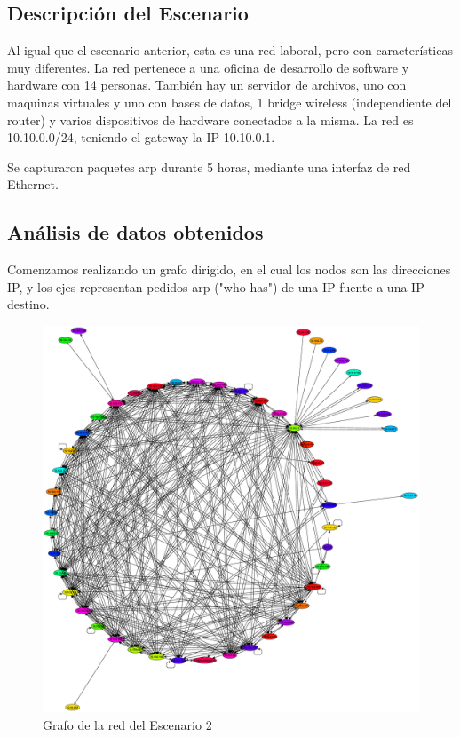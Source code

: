 \subsection{Descripci\'on del Escenario}
	\par Al igual que el escenario anterior, esta es una red laboral, pero con características muy diferentes. La red pertenece a una oficina de desarrollo de software y hardware con 14 personas. También hay un servidor de archivos, uno con maquinas virtuales y uno con bases de datos, 1 bridge wireless (independiente del router) y varios dispositivos de hardware conectados a la misma. La red es 10.10.0.0/24, teniendo el gateway la IP 10.10.0.1. 
     \par Se capturaron paquetes arp durante 5 horas, mediante una interfaz de red Ethernet.
     
\subsection{An\'alisis de datos obtenidos}
	\par Comenzamos realizando un grafo dirigido, en el cual los nodos son las direcciones IP, y los ejes representan pedidos arp ("who-has") de una IP fuente a una IP destino.
	\begin{figure}[!ht]
		\centering
		\includegraphics[width=\textwidth]{img/graph/escenario_2/grafico_de_la_red.eps}
		\caption{Grafo de la red del Escenario 2}
		\label{fig:grafo_escenario2}
	\end{figure}
    
